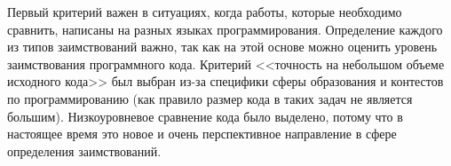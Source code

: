 Первый критерий важен в ситуациях, когда работы, которые необходимо сравнить, написаны на разных языках программирования. Определение каждого из типов заимствований важно, так как на этой основе можно оценить уровень заимствования программного кода. Критерий <<точность на небольшом объеме исходного кода>> был выбран из-за специфики сферы образования и контестов по программированию (как правило размер кода в таких задач не является большим). Низкоуровневое сравнение кода было выделено, потому что в настоящее время это новое и очень перспективное направление в сфере определения заимствований.
\pagebreak